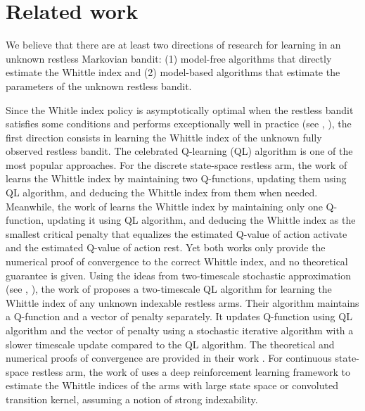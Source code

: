 


\section{Related work}
\label{ch:restless:related}

We believe that there are at least two directions of research for learning in an unknown restless Markovian bandit: (1) model-free algorithms that directly estimate the Whittle index and (2) model-based algorithms that estimate the parameters of the unknown restless bandit.

Since the Whitle index policy is asymptotically optimal when the restless bandit satisfies some conditions \cite{weber1990index} and performs exceptionally well in practice (see \eg, \cite{glazebrook2002index, ansell2003whittle, glazebrook2006some}), 
the first direction consists in learning the Whittle index of the unknown fully observed restless bandit.
The celebrated Q-learning (QL) algorithm \cite{watkins1989learning} is one of the most popular approaches.
For the discrete state-space restless arm, the work of \cite{gibson2021novel} learns the Whittle index by maintaining two Q-functions, updating them using QL algorithm, and deducing the Whittle index from them when needed.
Meanwhile, the work of \cite{fu2019towards} learns the Whittle index by maintaining only one Q-function, updating it using QL algorithm, and deducing the Whittle index as the smallest critical penalty that equalizes the estimated Q-value of action activate and the estimated Q-value of action rest.
Yet both works \cite{gibson2021novel, fu2019towards} only provide the numerical proof of convergence to the correct Whittle index, and no theoretical guarantee is given.
Using the ideas from two-timescale stochastic approximation (see \eg, \cite{abounadi2001learning, schwartz1993reinforcement}), the work of \cite{avrachenkov2022whittle} proposes a two-timescale QL algorithm for learning the Whittle index of any unknown indexable restless arms. Their algorithm maintains a Q-function and a vector of penalty separately. It updates Q-function using QL algorithm and the vector of penalty using a stochastic iterative algorithm with a slower timescale update compared to the QL algorithm.
The theoretical and numerical proofs of convergence are provided in their work \cite{avrachenkov2022whittle}.
For continuous state-space restless arm, the work of \cite{nakhleh2021neurwin} uses a deep reinforcement learning framework to estimate the Whittle indices of the arms with large state space or convoluted transition kernel, assuming a notion of strong indexability.

